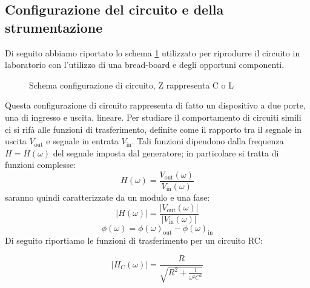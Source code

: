 \documentclass[letterpaper,12pt]{article}
\begin{document}
\subsection{Configurazione del circuito e della strumentazione}
Di seguito abbiamo riportato lo schema \ref{fig:config_circuito} utilizzato per riprodurre il circuito in laboratorio con l'utilizzo di una bread-board e degli opportuni componenti. 
\begin{figure}[h!]
    \centering
    \caption{Schema configurazione di circuito, Z rappresenta C o L }
    \label{fig:config_circuito}
\end{figure}
Questa configurazione di circuito rappresenta di fatto un dispositivo a due porte, una di ingresso e uscita, lineare. Per studiare il comportamento di circuiti simili ci si rifà alle funzioni di trasferimento, definite come il rapporto tra il segnale in uscita $V_\text{out}$ e segnale in entrata $V_\text{in}$. 
Tali funzioni dipendono dalla frequenza $H = H(\omega)$ del segnale imposta dal generatore; in particolare si tratta di funzioni complesse: 
$$ H(\omega) = \frac{V_\text{out}(\omega)}{V_\text{in}(\omega)}$$ 
saranno quindi caratterizzate da un modulo e una fase: 
$$ |{H(\omega)| = \frac{|V_\text{out}(\omega)|}{|V_\text{in}(\omega)|}}$$
$$ \phi(\omega) = \phi(\omega)_\text{out} - \phi(\omega)_\text{in} $$
Di seguito riportiamo le funzioni di trasferimento per un circuito RC:

\begin{equation}
\label{eq:Modulo RC}
    |H_C(\omega)| = \frac{R}{\sqrt{R^2 + \frac{1}{\omega^2C^2}}}
\end{equation}
\end{document}
